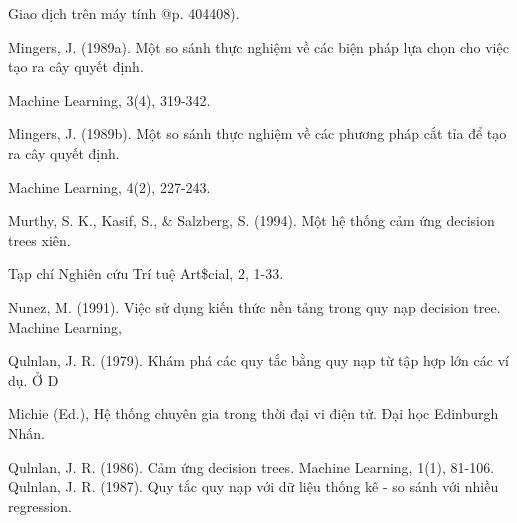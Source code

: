 Giao dịch trên máy tính @p. 404408).

Mingers, J. (1989a). Một so sánh thực nghiệm về các biện pháp lựa chọn cho việc tạo ra cây quyết định.

Machine Learning, 3(4), 319-342.

Mingers, J. (1989b). Một so sánh thực nghiệm về các phương pháp cắt tỉa để tạo ra cây quyết định.

Machine Learning, 4(2), 227-243.

Murthy, S. K., Kasif, S., \& Salzberg, S. (1994). Một hệ thống cảm ứng decision trees xiên.

Tạp chí Nghiên cứu Trí tuệ Art\$cial, 2, 1-33.

Nunez, M. (1991). Việc sử dụng kiến ​​thức nền tảng trong quy nạp decision tree. Machine Learning,

Qulnlan, J. R. (1979). Khám phá các quy tắc bằng quy nạp từ tập hợp lớn các ví dụ. Ở D

Michie (Ed.), Hệ thống chuyên gia trong thời đại vi điện tử. Đại học Edinburgh Nhấn.

Qulnlan, J. R. (1986). Cảm ứng decision trees. Machine Learning, 1(1), 81-106. Qulnlan, J. R. (1987). Quy tắc quy nạp với dữ liệu thống kê - so sánh với nhiều regression.

